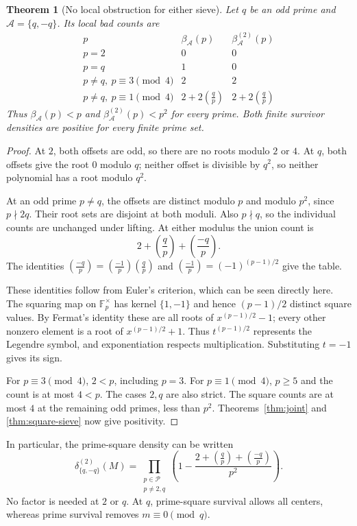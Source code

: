 \documentclass[11pt]{article}
\newtheorem{theorem}{Theorem}[section]
\theoremstyle{definition}
\theoremstyle{remark}
\newcommand{\Pset}{\mathcal P}
\newcommand{\leg}[2]{\left(\frac{#1}{#2}\right)}
\begin{document}
\begin{theorem}[No local obstruction for either sieve]\label{cor:signs}
Let $q$ be an odd prime and $\mathcal A=\{q,-q\}$. Its local bad counts are
\[
\begin{array}{c|cc}
 p & \beta_{\mathcal A}(p) & \beta^{(2)}_{\mathcal A}(p)\\ \hline
 p=2 &0&0\\
 p=q &1&0\\
 p\ne q,\ p\equiv3\pmod4 &2&2\\
 p\ne q,\ p\equiv1\pmod4 &2+2\leg{q}{p}&2+2\leg{q}{p}
\end{array}
\]
Thus $\beta_{\mathcal A}(p)<p$ and
$\beta^{(2)}_{\mathcal A}(p)<p^2$ for every prime. Both finite
survivor densities are positive for every finite prime set.
\end{theorem}
\begin{proof}
At $2$, both offsets are odd, so there are no roots modulo $2$ or $4$.
At $q$, both offsets give the root $0$ modulo $q$; neither offset
is divisible by $q^2$, so neither polynomial has a root modulo $q^2$.

At an odd prime $p\ne q$, the offsets are distinct modulo $p$ and
modulo $p^2$, since $p\nmid2q$. Their root sets are disjoint at
both moduli. Also $p\nmid q$, so the individual counts are unchanged
under lifting. At either modulus the union count is
\[
 2+\leg{q}{p}+\leg{-q}{p}.
\]
The identities $\leg{-q}{p}=\leg{-1}{p}\leg{q}{p}$ and
$\leg{-1}{p}=(-1)^{(p-1)/2}$ give the table.

These identities follow from Euler's criterion, which can be seen
directly here. The squaring map on $\mathbb F_p^\times$ has kernel
$\{1,-1\}$ and hence $(p-1)/2$ distinct square values. By Fermat's
identity these are all roots of $x^{(p-1)/2}-1$; every other nonzero
element is a root of $x^{(p-1)/2}+1$. Thus
$t^{(p-1)/2}$ represents the Legendre symbol, and exponentiation
respects multiplication. Substituting $t=-1$ gives its sign.

For $p\equiv3\pmod4$, $2<p$, including $p=3$.
For $p\equiv1\pmod4$, $p\ge5$ and the count is at most $4<p$.
The cases $2,q$ are also strict. The square counts are at most $4$
at the remaining odd primes, less than $p^2$.
Theorems~\ref{thm:joint} and \ref{thm:square-sieve} now give positivity.
\end{proof}

In particular, the prime-square density can be written
\[
 \delta^{(2)}_{\{q,-q\}}(M)
 =\prod_{\substack{p\in\Pset\\p\ne2,q}}
 \left(1-\frac{2+\leg{q}{p}+\leg{-q}{p}}{p^2}\right).
\]
No factor is needed at $2$ or $q$. At $q$, prime-square survival
allows all centers, whereas prime survival removes $m\equiv0\pmod q$.
\end{document}
